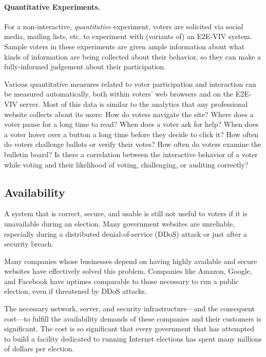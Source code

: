 \paragraph{Quantitative Experiments.}
For a non-interactive, \emph{quantitative} experiment, voters are
solicited via social media, mailing lists, etc. to experiment with
(variants of) an E2E-VIV system. Sample voters in these experiments
are given ample information about what kinds of information are being
collected about their behavior, so they can make a fully-informed
judgement about their participation.

Various quantitative measures related to voter participation and
interaction can be measured automatically, both within voters' web
browsers and on the E2E-VIV server. Most of this data is similar to
the analytics that any professional website collects about its users:
How do voters navigate the site?  Where does a voter pause for a long
time to read?  When does a voter ask for help?  When does a voter
hover over a button a long time before they decide to click it?  How
often do voters challenge ballots or verify their votes?  How often do
voters examine the bulletin board?  Is there a correlation between the
interactive behavior of a voter while voting and their likelihood of
voting, challenging, or auditing correctly?

\subsection{Availability}

A system that is correct, secure, and usable is still not useful to
voters if it is unavailable during an election. Many government
websites are unreliable, especially during a distributed
denial-of-service (DDoS) attack or just after a security breach.

Many companies whose businesses depend on having highly available and
secure websites have effectively solved this problem. Companies like
Amazon, Google, and Facebook have uptimes comparable to those
necessary to run a public election, even if threatened by DDoS
attacks.

The necessary network, server, and security infrastructure---and the
consequent cost---to fulfill the availability demands of these
companies and their customers is significant. The cost is so
significant that every government that has attempted to build a
facility dedicated to running Internet elections has spent many
millions of dollars per election.

